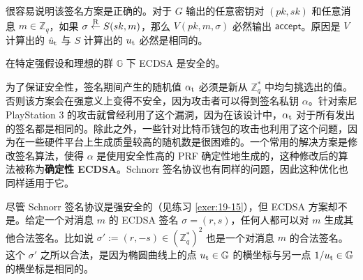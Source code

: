 很容易说明该签名方案是正确的。对于 $G$ 输出的任意密钥对 $(pk,sk)$ 和任意消息 $m\in\mathbb{Z}_q$，如果 $\sigma\overset{\rm R}\leftarrow S(sk,m)$，那么 $V(pk,m,\sigma)$ 必然输出 $\mathsf{accept}$。原因是 $V$ 计算出的 $\hat u_{\rm t}$ 与 $S$ 计算出的 $u_{\rm t}$ 必然是相同的。

在特定强假设和理想的群 $\mathbb{G}$ 下 ECDSA 是安全的。

为了保证安全性，签名期间产生的随机值 $\alpha_{\rm t}$ 必须是新从 $\mathbb{Z}_q^*$ 中均匀挑选出的值。否则该方案会在强意义上变得不安全，因为攻击者可以得到签名私钥 $\alpha$。针对索尼 PlayStation 3 的攻击就曾经利用了这个漏洞，因为在该设计中，$\alpha_{\rm t}$ 对于所有发出的签名都是相同的。除此之外，一些针对比特币钱包的攻击也利用了这个问题，因为在一些硬件平台上生成质量较高的随机数是很困难的。一个常用的解决方案是修改签名算法，使得 $\alpha$ 是使用安全性高的 PRF 确定性地生成的，这种修改后的算法被称为\textbf{确定性 ECDSA}。Schnorr 签名协议也有同样的问题，因此这种优化也同样适用于它。

\begin{snote}[ECDSA不是强安全的.]
尽管 Schnorr 签名协议是强安全的（见练习 \ref{exer:19-15}），但 ECDSA 方案却不是。给定一个对消息 $m$ 的 ECDSA 签名 $\sigma=(r,s)$，任何人都可以对 $m$ 生成其他合法签名。比如说 $\sigma':=(r,-s)\in(\mathbb{Z}_q^*)^2$ 也是一个对消息 $m$ 的合法签名。这个 $\sigma'$ 之所以合法，是因为椭圆曲线上的点 $u_{\rm t}\in\mathbb{G}$ 的横坐标与另一点 ${1}/{u_{\rm t}}\in\mathbb{G}$ 的横坐标是相同的。
\end{snote}